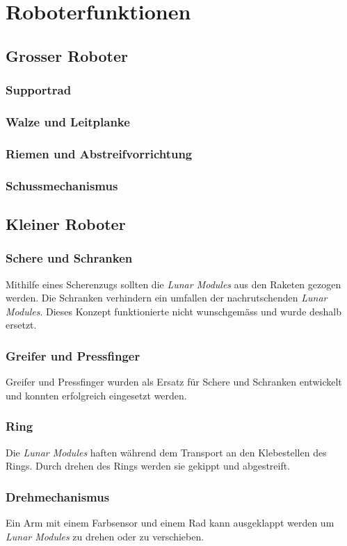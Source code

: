 \section{Roboterfunktionen}
\subsection{Grosser Roboter}

\begin{frame}
	\frametitle{Supportrad}
	
\end{frame}

\begin{frame}
	\frametitle{Walze und Leitplanke}
	
\end{frame}

\begin{frame}
	\frametitle{Riemen und Abstreifvorrichtung}
	
\end{frame}

\begin{frame}
	\frametitle{Schussmechanismus}
	
\end{frame}

\subsection{Kleiner Roboter}

\begin{frame}
	\frametitle{Schere und Schranken}
	Mithilfe eines Scherenzugs sollten die \textit{Lunar Modules} aus den Raketen gezogen werden.
	Die Schranken verhindern ein umfallen der nachrutschenden \textit{Lunar Modules}.
	Dieses Konzept funktionierte nicht wunschgemäss und wurde deshalb ersetzt.	
\end{frame}

\begin{frame}
	\frametitle{Greifer und Pressfinger}
	Greifer und Pressfinger wurden als Ersatz für Schere und Schranken entwickelt und konnten erfolgreich eingesetzt werden.
\end{frame}

\begin{frame}
	\frametitle{Ring}
	Die \textit{Lunar Modules} haften während dem Transport an den Klebestellen des Rings.
	Durch drehen des Rings werden sie gekippt und abgestreift.
\end{frame}

\begin{frame}
	\frametitle{Drehmechanismus}
	Ein Arm mit einem Farbsensor und einem Rad kann ausgeklappt werden um \textit{Lunar Modules} zu drehen oder zu verschieben.
\end{frame}